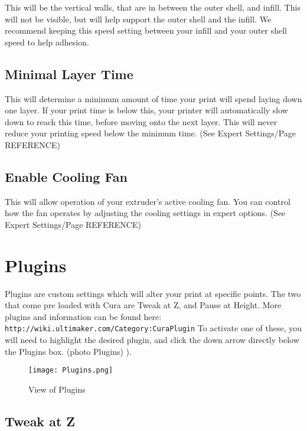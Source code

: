This will be the vertical walls, that are in between the outer shell, 	and infill. This will not be visible, but will help support the outer shell and the infill. We recommend keeping this speed setting between your infill and your outer shell speed to help adhesion.

\subsection{Minimal Layer Time}

This will determine a minimum amount of time your print will spend laying down one layer. If your print time is below this, your printer will automatically slow down to reach this time, before moving onto the next layer. This will never reduce your printing speed below the minimum time. (See Expert Settings/Page REFERENCE)

\subsection{Enable Cooling Fan}

This will allow operation of your extruder's active cooling fan. You can control how the fan operates by adjusting the cooling settings in expert options. (See Expert Settings/Page REFERENCE)

\section{Plugins}

Plugins are custom settings which will alter your print at specific points. The two that come pre loaded with Cura are Tweak at Z, and Pause at Height. More plugins and information can be found here: \texttt{http://wiki.ultimaker.com/Category:CuraPlugin} To activate one of these, you will need to highlight the desired plugin, and click the down arrow directly below the Plugins box. (photo Plugins)
\pageref{fig:Plugins}).
\begin{figure}[hbt]
\centering
\texttt{[image: Plugins.png]}
\caption{View of Plugins}
\label{fig:Plugins}
\end{figure}

\subsection{Tweak at Z}


